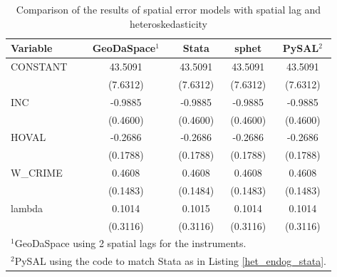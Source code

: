 \documentclass{article}
\begin{document}
\begin{table}[htpb]
\caption{Comparison of the results of spatial error models with spatial lag and heteroskedasticity}
\label{t:res_het_combo}
\centering
\begin{small}
\begin{tabular}{l|cccc} \hline
\textbf{Variable}&\textbf{GeoDaSpace$^1$}&\textbf{Stata}&\textbf{sphet}&\textbf{PySAL$^2$}\\ \hline
CONSTANT&43.5091&43.5091&43.5091&43.5091\\
&(7.6312)&(7.6312)&(7.6312)&(7.6312)\\
INC&-0.9885&-0.9885&-0.9885&-0.9885\\
&(0.4600)&(0.4600)&(0.4600)&(0.4600)\\
HOVAL&-0.2686&-0.2686&-0.2686&-0.2686\\
&(0.1788)&(0.1788)&(0.1788)&(0.1788)\\
W\_CRIME&0.4608&0.4608&0.4608&0.4608\\
&(0.1483)&(0.1484)&(0.1483)&(0.1483)\\
lambda&0.1014&0.1015&0.1014&0.1014\\
&(0.3116)&(0.3116)&(0.3116)&(0.3116)\\
\hline
\multicolumn{5}{l}{\scriptsize{$^1$GeoDaSpace using 2 spatial lags for the instruments.}} \\
\multicolumn{5}{l}{\scriptsize{$^2$PySAL using the code to match Stata as in Listing \ref{het_endog_stata}.}} \\
\end{tabular}
\end{small}
\end{table}
\end{document}
